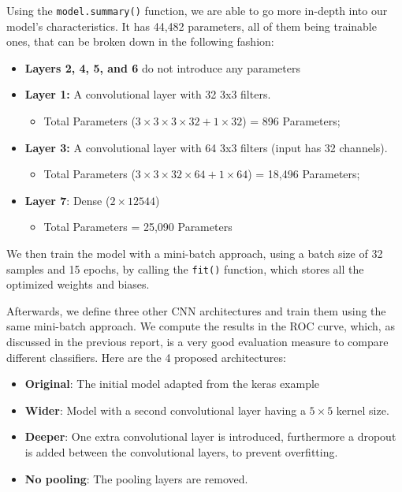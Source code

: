 \documentclass{thesisreport}
\begin{document}
Using the \texttt{model.summary()} function, we are able to go more in-depth into our model's characteristics. It has 44,482 parameters, all of them being trainable ones, that can be broken down in the following fashion:

\begin{itemize}
  \item \textbf{Layers 2, 4, 5, and 6} do not introduce any parameters
  \item \textbf{Layer 1:} A convolutional layer with 32 3x3 filters.
    \begin{itemize}
      \item Total Parameters ($3 \times 3 \times 3 \times 32 + 1 \times 32$) = 896 Parameters;
    \end{itemize}
  \item \textbf{Layer 3:} A convolutional layer with 64 3x3 filters (input has 32 channels).
    \begin{itemize}
      \item Total Parameters ($3 \times 3 \times 32 \times 64 + 1 \times 64$) = 18,496 Parameters;
    \end{itemize}
  \item \textbf{Layer 7}: Dense ($2 \times 12544$)
    \begin{itemize}
      \item Total Parameters = 25,090 Parameters
    \end{itemize}
\end{itemize}

We then train the model with a mini-batch approach, using a batch size of 32 samples and 15 epochs, by calling the \texttt{fit()} function, which stores all the optimized weights and biases.

Afterwards, we define three other CNN architectures and train them using the same mini-batch approach. We compute the results in the ROC curve, which, as discussed in the previous report, is a very good evaluation measure to compare different classifiers.
Here are the 4 proposed architectures:\\
\begin{itemize}
  \item \textbf{Original}: The initial model adapted from the keras example
  \item \textbf{Wider}: Model with a second convolutional layer having a $5 \times 5$ kernel size.
  \item \textbf{Deeper}: One extra convolutional layer is introduced, furthermore a dropout is added between the convolutional layers, to prevent overfitting.
  \item \textbf{No pooling}: The pooling layers are removed. 
\end{itemize}
\end{document}
